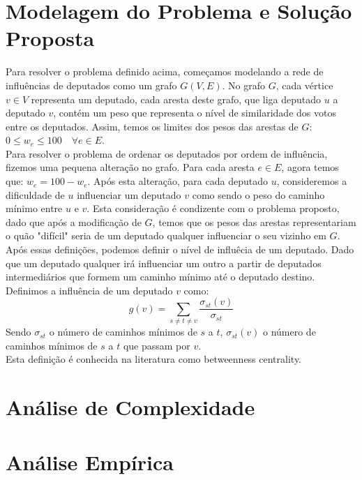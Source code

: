\documentclass[10pt]{article}
\begin{document}
\section{Modelagem do Problema e Solução Proposta}
Para resolver o problema definido acima, começamos modelando a rede de influências de deputados como um grafo $G(V, E)$. No grafo $G$, cada vértice $v \in V$ representa um deputado, cada aresta deste grafo, que liga deputado $u$ a deputado $v$, contém um peso que representa o nível de similaridade dos votos entre os deputados. Assim, temos os limites dos pesos das arestas de $G$: $0 \leq w_e \leq 100 \quad \forall e \in E$.\\
Para resolver o problema de ordenar os deputados por ordem de influência, fizemos uma pequena alteração no grafo. Para cada aresta $e \in E$, agora temos que: $w_e = 100 - w_e$. Após esta alteração, para cada deputado $u$, consideremos a dificuldade de $u$ influenciar um deputado $v$ como sendo o peso do caminho mínimo entre $u$ e $v$. Esta consideração é condizente com o problema proposto, dado que após a modificação de $G$, temos que os pesos das arestas representariam o quão "difícil" seria de um deputado qualquer influenciar o seu vizinho em $G$.\\
Após essas definições, podemos definir o nível de influêcia de um deputado. Dado que um deputado qualquer irá influenciar um outro a partir de deputados intermediários que formem um caminho mínimo até o deputado destino. Definimos a influência de um deputado $v$ como:
$$g(v) = \sum_{s \neq t \neq v} \frac{\sigma_{st}(v)}{\sigma_{st}}$$
Sendo $\sigma_{st}$ o número de caminhos mínimos de $s$ a $t$, $\sigma_{st}(v)$ o número de caminhos mínimos de $s$ a $t$ que passam por $v$.\\
Esta definição é conhecida na literatura como betweenness centrality.


\section{Análise de Complexidade}



\section{Análise Empírica}
\end{document}
